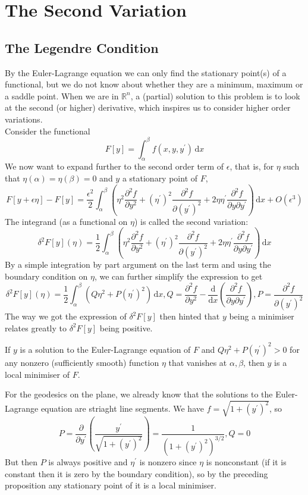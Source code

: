 \section{The Second Variation}
\subsection{The Legendre Condition}
By the Euler-Lagrange equation we can only find the stationary point(s) of a functional, but we do not know about whether they are a minimum, maximum or a saddle point.
When we are in $\mathbb R^n$, a (partial) solution to this problem is to look at the second (or higher) derivative, which inspires us to consider higher order variations.\\
Consider the functional
$$F[y]=\int_\alpha^\beta f(x,y,y^\prime)\,\mathrm dx$$
We now want to expand further to the second order term of $\epsilon$, that is, for $\eta$ such that $\eta(\alpha)=\eta(\beta)=0$ and $y$ a stationary point of $F$,
$$F[y+\epsilon\eta]-F[y]=\frac{\epsilon^2}{2}\int_\alpha^\beta\left( \eta^2\frac{\partial^2f}{\partial y^2}+(\eta^\prime)^2\frac{\partial^2f}{\partial(y^\prime)^2}+2\eta\eta^\prime\frac{\partial^2f}{\partial y\partial y^\prime} \right)\,\mathrm dx+O(\epsilon^3)$$
The integrand (as a functional on $\eta$) is called the second variation:
$$\delta^2 F[y](\eta)=\frac{1}{2}\int_\alpha^\beta\left( \eta^2\frac{\partial^2f}{\partial y^2}+(\eta^\prime)^2\frac{\partial^2f}{\partial(y^\prime)^2}+2\eta\eta^\prime\frac{\partial^2f}{\partial y\partial y^\prime} \right)\,\mathrm dx$$
By a simple integration by part argument on the last term and using the boundary condition on $\eta$, we can further simplify the expression to get
$$\delta^2F[y](\eta)=\frac{1}{2}\int_\alpha^\beta(Q\eta^2+P(\eta^\prime)^2)\,\mathrm dx,Q=\frac{\partial^2f}{\partial y^2}-\frac{\mathrm d}{\mathrm dx}\left( \frac{\partial^2 f}{\partial y\partial y^\prime}\right),P=\frac{\partial^2f}{\partial (y^\prime)^2}$$
The way we got the expression of $\delta^2F[y]$ then hinted that $y$ being a minimiser relates greatly to $\delta^2F[y]$ being positive.
\begin{proposition}
    If $y$ is a solution to the Euler-Lagrange equation of $F$ and $Q\eta^2+P(\eta^\prime)^2>0$ for any nonzero (sufficiently smooth) function $\eta$ that vanishes at $\alpha,\beta$, then $y$ is a local minimiser of $F$.
\end{proposition}
\begin{example}
    For the geodesics on the plane, we already know that the solutions to the Euler-Lagrange equation are striaght line segments.
    We have $f=\sqrt{1+(y^\prime)^2}$, so
    $$P=\frac{\partial}{\partial y^\prime}\left( \frac{y^\prime}{\sqrt{1+(y^\prime)^2}} \right)=\frac{1}{(1+(y^\prime)^2)^{3/2}},Q=0$$
    But then $P$ is always positive and $\eta^\prime$ is nonzero since $\eta$ is nonconstant (if it is constant then it is zero by the boundary condition), so by the preceding proposition any stationary point of it is a local minimiser.
\end{example}
